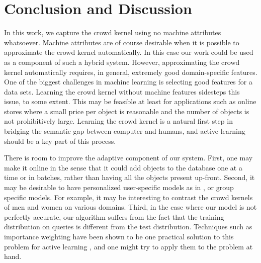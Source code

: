 \documentclass{article}
\begin{document}
\section{Conclusion and Discussion}
In this work, we capture the crowd kernel using no machine attributes
whatsoever.  Machine attributes are of course desirable when it is
possible to approximate the crowd kernel automatically. In this case
our work could be used as a component of such a hybrid
system. However, approximating the crowd kernel automatically
requires, in general, extremely good domain-specific features.  One of
the biggest challenges in machine learning is selecting good features
for a data sets.  Learning the crowd kernel without machine features
sidesteps this issue, to some extent.  This may be feasible at least
for applications such as online stores where a small price per object
is reasonable and the number of objects is not prohibitively large.
Learning the crowd kernel is a natural first step in bridging the
semantic gap between computer and humans, and active learning should
be a key part of this process.

There is room to improve the adaptive component of our system.  First,
one may make it online in the sense that it could add objects to the
database one at a time or in batches, rather than having all the
objects present up-front.  Second, it may be desirable to have
personalized user-specific models as in \cite{??}, or group specific
models.  For example, it may be interesting to contrast the crowd
kernels of men and women on various domains.  Third, in the case where
our model is not perfectly accurate, our algorithm suffers from the
fact that the training distribution on queries is different from the
test distribution.  Techniques such as importance weighting have been
shown to be one practical solution to this problem for active learning
\cite{BDL09}, and one might try to apply them to the problem at hand.



\end{document}
